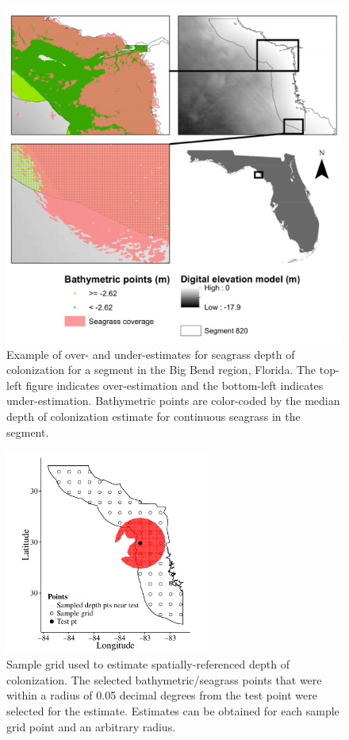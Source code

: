 \documentclass[letterpaper,12pt]{article}\usepackage[]{graphicx}\usepackage[]{color}
\begin{document}
\begin{figure}
\centerline{\includegraphics[width = \textwidth]{figs/wbid_doc2.pdf}}
\caption{Example of over- and under-estimates for seagrass depth of colonization for a segment in the Big Bend region, Florida.  The top-left figure indicates over-estimation and the bottom-left indicates under-estimation.  Bathymetric points are color-coded by the median depth of colonization estimate for continuous seagrass in the segment.}
\label{fig:wbid_doc2}
\end{figure}

\begin{figure}
\centerline{\includegraphics[width = 0.6\textwidth]{figs/buff_ex.pdf}}
\caption{Sample grid used to estimate spatially-referenced depth of colonization.  The selected bathymetric/seagrass points that were within a radius of 0.05 decimal degrees from the test point were selected for the estimate.  Estimates can be obtained for each sample grid point and an arbitrary radius.}
\label{fig:buff_ex}
\end{figure}
\end{document}
